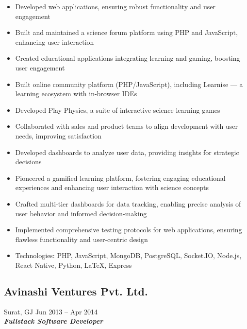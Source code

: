 \documentclass[10pt,a4paper]{article}
\begin{document}
\begin{itemize}[leftmargin=*, nosep]
  \item Developed web applications, ensuring robust functionality and user engagement
  \item Built and maintained a science forum platform using PHP and JavaScript, enhancing user interaction
  \item Created educational applications integrating learning and gaming, boosting user engagement
  \item Built online community platform (PHP/JavaScript), including Learnise --- a learning ecosystem with in-browser IDEs
  \item Developed Play Physics, a suite of interactive science learning games
  \item Collaborated with sales and product teams to align development with user needs, improving satisfaction
  \item Developed dashboards to analyze user data, providing insights for strategic decisions
  \item Pioneered a gamified learning platform, fostering engaging educational experiences and enhancing user interaction with science concepts
  \item Crafted multi-tier dashboards for data tracking, enabling precise analysis of user behavior and informed decision-making
  \item Implemented comprehensive testing protocols for web applications, ensuring flawless functionality and user-centric design
  \item Technologies: PHP, JavaScript, MongoDB, PostgreSQL, Socket.IO, Node.js, React Native, Python, LaTeX, Express
\end{itemize}

\subsection*{\large Avinashi Ventures Pvt. Ltd.}
\textcolor{datecolor}{Surat, GJ \textbar Jun 2013 -- Apr 2014} \\
\textbf{\textit{Fullstack Software Developer}}
\end{document}
